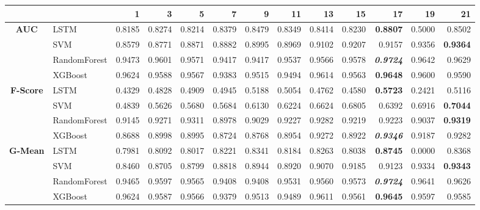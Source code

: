 \begin{table}[H]
	\centering
	\begin{adjustbox}{max width=12cm}
		\begin{tabular}{|c|l|r|r|r|r|r|r|r|r|r|r|r|}
			\hline
			&         &      1  &      3  &      5  &      7  &      9  &      11 &      13 &      15 &      17 &      19 &      21 \\
			\hline
			\textbf{AUC} &  LSTM &  0.8185 &  0.8274 &  0.8214 &  0.8379 &  0.8479 &  0.8349 &  0.8414 &  0.8230 & \textbf{  0.8807 } &  0.5000 &  0.8502 \\
			&  SVM &  0.8579 &  0.8771 &  0.8871 &  0.8882 &  0.8995 &  0.8969 &  0.9102 &  0.9207 &  0.9157 &  0.9356 & \textbf{  0.9364 } \\
			&  RandomForest &  0.9473 &  0.9601 &  0.9571 &  0.9417 &  0.9417 &  0.9537 &  0.9566 &  0.9578 & \textit{ \textbf{  0.9724 } } &  0.9642 &  0.9629 \\
			&  XGBoost &  0.9624 &  0.9588 &  0.9567 &  0.9383 &  0.9515 &  0.9494 &  0.9614 &  0.9563 & \textbf{  0.9648 } &  0.9600 &  0.9590 \\
			\hline
			\textbf{F-Score} &  LSTM &  0.4329 &  0.4828 &  0.4909 &  0.4945 &  0.5188 &  0.5054 &  0.4762 &  0.4580 & \textbf{  0.5723 } &  0.2421 &  0.5116 \\
			&  SVM &  0.4839 &  0.5626 &  0.5680 &  0.5684 &  0.6130 &  0.6224 &  0.6624 &  0.6805 &  0.6392 &  0.6916 & \textbf{  0.7044 } \\
			&  RandomForest &  0.9145 &  0.9271 &  0.9311 &  0.8978 &  0.9029 &  0.9227 &  0.9282 &  0.9219 &  0.9223 &  0.9037 & \textbf{  0.9319 } \\
			&  XGBoost &  0.8688 &  0.8998 &  0.8995 &  0.8724 &  0.8768 &  0.8954 &  0.9272 &  0.8922 & \textit{ \textbf{  0.9346 } } &  0.9187 &  0.9282 \\
			\hline
			\textbf{G-Mean} &  LSTM &  0.7981 &  0.8092 &  0.8017 &  0.8221 &  0.8341 &  0.8184 &  0.8263 &  0.8038 & \textbf{  0.8745 } &  0.0000 &  0.8368 \\
			&  SVM &  0.8460 &  0.8705 &  0.8799 &  0.8818 &  0.8944 &  0.8920 &  0.9070 &  0.9185 &  0.9123 &  0.9334 & \textbf{  0.9343 } \\
			&  RandomForest &  0.9465 &  0.9597 &  0.9565 &  0.9408 &  0.9408 &  0.9531 &  0.9560 &  0.9573 & \textit{ \textbf{  0.9724 } } &  0.9641 &  0.9626 \\
			&  XGBoost &  0.9624 &  0.9587 &  0.9566 &  0.9379 &  0.9513 &  0.9489 &  0.9611 &  0.9561 & \textbf{  0.9645 } &  0.9597 &  0.9585 \\

\end{tabular}
\end{adjustbox}
\end{table}
